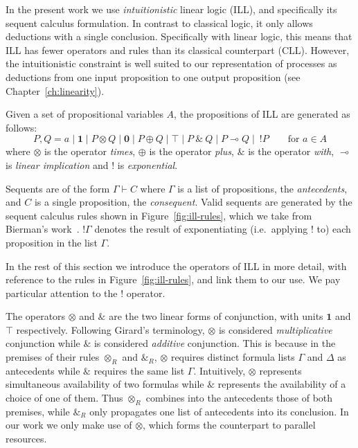 \documentclass[class=smolathesis,crop=false]{standalone}
\begin{document}
In the present work we use \emph{intuitionistic} linear logic (ILL), and specifically its sequent calculus formulation.
In contrast to classical logic, it only allows deductions with a single conclusion.
Specifically with linear logic, this means that ILL has fewer operators and rules than its classical counterpart (CLL).
However, the intuitionistic constraint is well suited to our representation of processes as deductions from one input proposition to one output proposition (see Chapter~\ref{ch:linearity}).

Given a set of propositional variables $A$, the propositions of ILL are generated as follows:
\begin{equation}
\label{eq:ill-prop}
    P, Q = a \mid \mathbf{1} \mid P \otimes Q \mid \mathbf{0} \mid P \oplus Q \mid \top \mid P\ \&\ Q \mid P \multimap Q \mid\ !P \qquad \text{for } a \in A
\end{equation}
where $\otimes$ is the operator \emph{times}, $\oplus$ is the operator \emph{plus}, $\&$ is the operator \emph{with}, $\multimap$ is \emph{linear implication} and $!$ is \emph{exponential}.

Sequents are of the form $\Gamma \vdash C$ where $\Gamma$ is a list of propositions, the \emph{antecedents}, and $C$ is a single proposition, the \emph{consequent}.
Valid sequents are generated by the sequent calculus rules shown in Figure~\ref{fig:ill-rules}, which we take from Bierman's work~\cite{bierman-1994}.
$!\Gamma$ denotes the result of exponentiating (i.e.\ applying $!$ to) each proposition in the list $\Gamma$.

In the rest of this section we introduce the operators of ILL in more detail, with reference to the rules in Figure~\ref{fig:ill-rules}, and link them to our use.
We pay particular attention to the $!$ operator.

The operators $\otimes$ and $\&$ are the two linear forms of conjunction, with units $\mathbf{1}$ and $\top$ respectively.
Following Girard's terminology, $\otimes$ is considered \emph{multiplicative} conjunction while $\&$ is considered \emph{additive} conjunction.
This is because in the premises of their rules $\otimes_R$ and $\&_R$, $\otimes$ requires distinct formula lists $\Gamma$ and $\Delta$ as antecedents while $\&$ requires the same list $\Gamma$.
Intuitively, $\otimes$ represents simultaneous availability of two formulas while $\&$ represents the availability of a choice of one of them.
Thus $\otimes_R$ combines into the antecedents those of both premises, while $\&_R$ only propagates one list of antecedents into its conclusion.
In our work we only make use of $\otimes$, which forms the counterpart to parallel resources.
\end{document}
